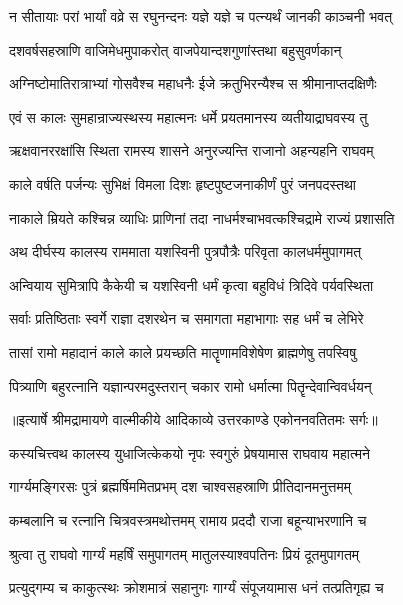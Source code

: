 \twolineshloka
{न सीतायाः परां भार्यां वव्रे स रघुनन्दनः}
{यज्ञे यज्ञे च पत्न्यर्थं जानकी काञ्चनी भवत्} %

\twolineshloka
{दशवर्षसहस्राणि वाजिमेधमुपाकरोत्}
{वाजपेयान्दशगुणांस्तथा बहुसुवर्णकान्} %

\twolineshloka
{अग्निष्टोमातिरात्राभ्यां गोसवैश्च महाधनैः}
{ईजे क्रतुभिरन्यैश्च स श्रीमानाप्तदक्षिणैः} %

\twolineshloka
{एवं स कालः सुमहान्राज्यस्थस्य महात्मनः}
{धर्मे प्रयतमानस्य व्यतीयाद्राघवस्य तु} %

\twolineshloka
{ऋक्षवानररक्षांसि स्थिता रामस्य शासने}
{अनुरज्यन्ति राजानो अहन्यहनि राघवम्} %

\twolineshloka
{काले वर्षति पर्जन्यः सुभिक्षं विमला दिशः}
{हृष्टपुष्टजनाकीर्णं पुरं जनपदस्तथा} %

\twolineshloka
{नाकाले म्रियते कश्चिन्न व्याधिः प्राणिनां तदा}
{नाधर्मश्चाभवत्कश्चिद्रामे राज्यं प्रशासति} %

\twolineshloka
{अथ दीर्घस्य कालस्य राममाता यशस्विनी}
{पुत्रपौत्रैः परिवृता कालधर्ममुपागमत्} %

\twolineshloka
{अन्वियाय सुमित्रापि कैकेयी च यशस्विनी}
{धर्मं कृत्वा बहुविधं त्रिदिवे पर्यवस्थिता} %

\twolineshloka
{सर्वाः प्रतिष्ठिताः स्वर्गे राज्ञा दशरथेन च}
{समागता महाभागाः सह धर्मं च लेभिरे} %

\twolineshloka
{तासां रामो महादानं काले काले प्रयच्छति}
{मातॄणामविशेषेण ब्राह्मणेषु तपस्विषु} %

\twolineshloka
{पित्र्याणि बहुरत्नानि यज्ञान्परमदुस्तरान्}
{चकार रामो धर्मात्मा पितॄन्देवान्विवर्धयन्} %


{॥इत्यार्षे श्रीमद्रामायणे वाल्मीकीये आदिकाव्ये उत्तरकाण्डे एकोननवतितमः सर्गः॥}


\twolineshloka
{कस्यचित्त्वथ कालस्य युधाजित्केकयो नृपः}
{स्वगुरुं प्रेषयामास राघवाय महात्मने} %

\twolineshloka
{गार्ग्यमङ्गिरसः पुत्रं ब्रह्मर्षिममितप्रभम्}
{दश चाश्वसहस्राणि प्रीतिदानमनुत्तमम्} %

\twolineshloka
{कम्बलानि च रत्नानि चित्रवस्त्रमथोत्तमम्}
{रामाय प्रददौ राजा बहून्याभरणानि च} %

\twolineshloka
{श्रुत्वा तु राघवो गार्ग्यं महर्षिं समुपागतम्}
{मातुलस्याश्वपतिनः प्रियं दूतमुपागतम्} %

\twolineshloka
{प्रत्युद्गम्य च काकुत्स्थः क्रोशमात्रं सहानुगः}
{गार्ग्यं संपूजयामास धनं तत्प्रतिगृह्य च} %

